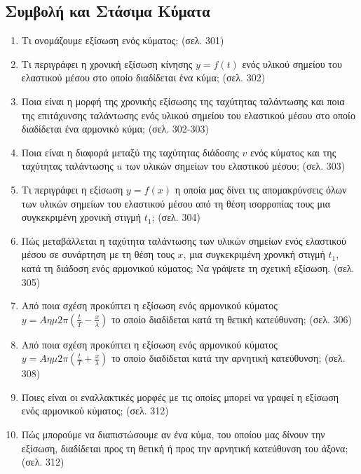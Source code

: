 \documentclass{article}
\begin{document}
\subsection{Συμβολή και Στάσιμα Κύματα}

\begin{enumerate}
      \item Τι ονομάζουμε εξίσωση ενός κύματος; (σελ. 301)

      \item Τι περιγράφει η χρονική εξίσωση κίνησης $y = f(t)$ ενός υλικού σημείου του ελαστικού μέσου στο οποίο διαδίδεται ένα κύμα; (σελ. 302)

      \item Ποια είναι η μορφή της χρονικής εξίσωσης της ταχύτητας ταλάντωσης και ποια της επιτάχυνσης ταλάντωσης ενός υλικού σημείου του ελαστικού μέσου στο οποίο διαδίδεται ένα αρμονικό κύμα; (σελ. 302-303)

      \item Ποια είναι η διαφορά μεταξύ της ταχύτητας διάδοσης $v$ ενός κύματος και της ταχύτητας ταλάντωσης $u$ των υλικών σημείων του ελαστικού μέσου; (σελ. 303)

      \item Τι περιγράφει η εξίσωση $y = f(x)$ η οποία μας δίνει τις απομακρύνσεις όλων των υλικών σημείων του ελαστικού μέσου από τη θέση ισορροπίας τους μια συγκεκριμένη χρονική στιγμή $t_1$; (σελ. 304)

      \item Πώς μεταβάλλεται η ταχύτητα ταλάντωσης των υλικών σημείων ενός ελαστικού μέσου σε συνάρτηση με τη θέση τους $x$, μια συγκεκριμένη χρονική στιγμή $t_1$, κατά τη διάδοση ενός αρμονικού κύματος; Να γράψετε τη σχετική εξίσωση. (σελ. 305)

      \item Από ποια σχέση προκύπτει η εξίσωση ενός αρμονικού κύματος $y = A\eta\mu 2\pi (\frac{t}{T} - \frac{x}{\lambda})$ το οποίο διαδίδεται κατά τη θετική κατεύθυνση; (σελ. 306)

      \item Από ποια σχέση προκύπτει η εξίσωση ενός αρμονικού κύματος $y = A\eta\mu 2\pi (\frac{t}{T} + \frac{x}{\lambda})$ το οποίο διαδίδεται κατά την αρνητική κατεύθυνση; (σελ. 308)

      \item Ποιες είναι οι εναλλακτικές μορφές με τις οποίες μπορεί να γραφεί η εξίσωση ενός αρμονικού κύματος; (σελ. 312)

      \item Πώς μπορούμε να διαπιστώσουμε αν ένα κύμα, του οποίου μας δίνουν την εξίσωση, διαδίδεται προς τη θετική ή προς την αρνητική κατεύθυνση του άξονα; (σελ. 312)


\end{enumerate}
\end{document}

